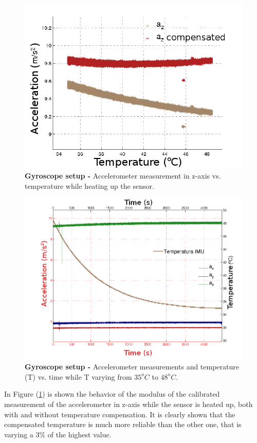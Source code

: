 \documentclass[conference]{IEEEtran}
\newcommand{\refp}[1]{(\ref{#1})}
\begin{document}
\begin{figure}
	\centering
	\includegraphics[width=.8\columnwidth]{./pics_paper/resultado_temp.png}
	\caption{\textbf{Gyroscope setup - }Accelerometer measurement in z-axis vs. temperature while heating up the sensor.}
	\label{fig:resultado_temp}
\end{figure}
\begin{figure}
	\centering
	\includegraphics[width=.8\columnwidth]{./pics_paper/bajada.png}
	\caption{\textbf{Gyroscope setup - }Accelerometer measurements and temperature (T) vs. time while T varying from $35^oC$ to $48^oC$.}
	\label{fig:bajada}
\end{figure}

\balance
In Figure \refp{fig:resultado_temp} is shown the behavior of the modulus of the calibrated
measurement of the accelerometer in z-axis while the sensor is
heated up, both with and without temperature compensation.
It is clearly shown that the compensated temperature is much
more reliable than the other one, that is varying a 3\% of the
highest value.\\
\end{document}
